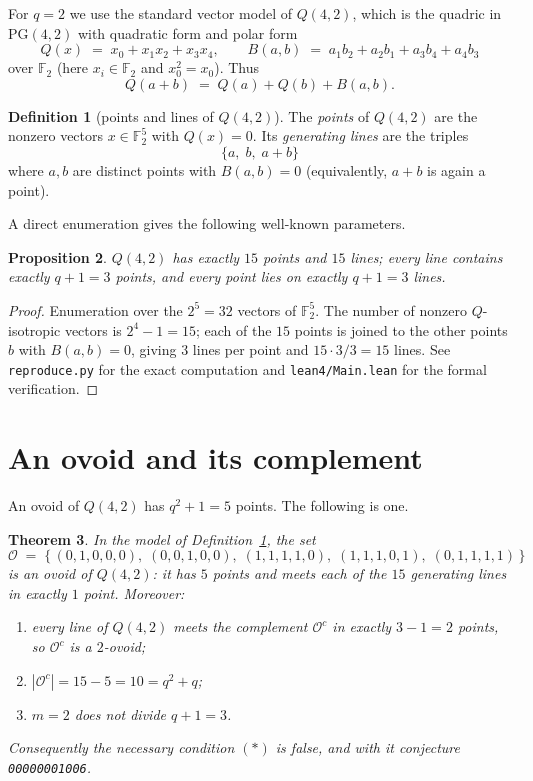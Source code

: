 \documentclass[11pt]{article}
\newtheorem{theorem}{Theorem}
\newtheorem{proposition}[theorem]{Proposition}
\theoremstyle{definition}
\newtheorem{definition}[theorem]{Definition}
\theoremstyle{remark}
\newcommand{\F}{\mathbb{F}}
\newcommand{\PG}{\mathrm{PG}}
\newcommand{\ov}{\mathcal{O}}
\begin{document}
For $q=2$ we use the standard vector model of $Q(4,2)$, which is the quadric in
$\PG(4,2)$ with quadratic form and polar form
\[
Q(x) \;=\; x_0 + x_1 x_2 + x_3 x_4, \qquad
B(a,b) \;=\; a_1 b_2 + a_2 b_1 + a_3 b_4 + a_4 b_3
\]
over $\F_2$ (here $x_i \in \F_2$ and $x_0^2 = x_0$). Thus
\[
Q(a+b) \;=\; Q(a) + Q(b) + B(a,b).
\]

\begin{definition}[points and lines of $Q(4,2)$]\label{def:q42}
The \emph{points} of $Q(4,2)$ are the nonzero vectors $x \in \F_2^5$ with
$Q(x)=0$. Its \emph{generating lines} are the triples
\[
\{a,\; b,\; a+b\}
\]
where $a,b$ are distinct points with $B(a,b)=0$ (equivalently, $a+b$ is again a
point).
\end{definition}

A direct enumeration gives the following well-known parameters.

\begin{proposition}\label{prop:params}
$Q(4,2)$ has exactly $15$ points and $15$ lines; every line contains exactly
$q+1 = 3$ points, and every point lies on exactly $q+1 = 3$ lines.
\end{proposition}

\begin{proof}
Enumeration over the $2^5 = 32$ vectors of $\F_2^5$. The number of nonzero
$Q$-isotropic vectors is $2^4 - 1 = 15$; each of the $15$ points is joined to
the other points $b$ with $B(a,b)=0$, giving $3$ lines per point and
$15 \cdot 3 / 3 = 15$ lines. See \texttt{reproduce.py} for the exact
computation and \texttt{lean4/Main.lean} for the formal verification.
\end{proof}

\section{An ovoid and its complement}

An ovoid of $Q(4,2)$ has $q^2+1 = 5$ points. The following is one.

\begin{theorem}\label{thm:main}
In the model of Definition~\ref{def:q42}, the set
\[
\ov \;=\; \bigl\{\, (0,1,0,0,0),\; (0,0,1,0,0),\; (1,1,1,1,0),\;
(1,1,1,0,1),\; (0,1,1,1,1) \,\bigr\}
\]
is an ovoid of $Q(4,2)$: it has $5$ points and meets each of the $15$ generating
lines in exactly $1$ point. Moreover:
\begin{enumerate}
\item every line of $Q(4,2)$ meets the complement $\ov^{c}$ in exactly
      $3 - 1 = 2$ points, so $\ov^{c}$ is a $2$-ovoid;
\item $|\ov^{c}| = 15 - 5 = 10 = q^2 + q$;
\item $m = 2$ does not divide $q+1 = 3$.
\end{enumerate}
Consequently the necessary condition $(\ast)$ is false, and with it conjecture
\texttt{00000001006}.
\end{theorem}
\end{document}
